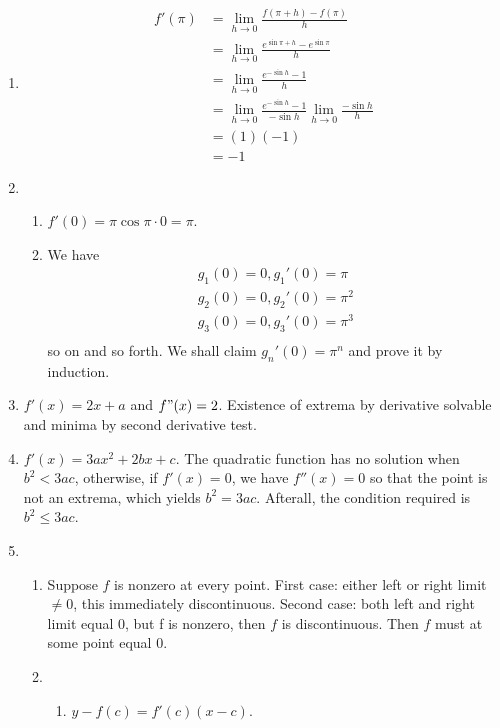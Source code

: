 \documentclass[12pt]{article}
\begin{document}
    \begin{enumerate}
        \item \begin{align*}
            f'(\pi)&=\lim_{h\to 0}\frac{f(\pi+h)-f(\pi)}{h}\\
            &=\lim_{h\to 0}\frac{e^{\sin{\pi+h}}-e^{\sin{\pi}}}{h}\\
            &=\lim_{h\to 0}\frac{e^{-\sin{h}}-1}{h}\\
            &=\lim_{h\to 0}\frac{e^{-\sin{h}}-1}{-\sin{h}}\lim_{h\to 0}\frac{-\sin{h}}{h}\\
            &=(1)(-1)\\
            &=-1
        \end{align*}
        \item \begin{enumerate}
            \item $f'(0)=\pi\cos{\pi\cdot 0}=\pi$.
            \item We have \begin{align*}
                g_1(0)=0, g_1'(0)=\pi\\
                g_2(0)=0, g_2'(0)=\pi^2\\
                g_3(0)=0, g_3'(0)=\pi^3\\
            \end{align*}
            so on and so forth. We shall claim $g_n'(0)=\pi^n$ and prove it by induction.
        \end{enumerate}
        \item $f'(x)=2x+a$ and $f"(x)=2$. Existence of extrema by derivative solvable and minima by second derivative test.
        \item $f'(x)=3ax^2+2bx+c$. The quadratic function has no solution when $b^2<3ac$, otherwise, if $f'(x)=0$, we have $f''(x)=0$ so that the point is not an extrema, which yields $b^2=3ac$. Afterall, the condition required is $b^2\leq 3ac$.
        \item \begin{enumerate}
            \item Suppose $f$ is nonzero at every point. First case: either left or right limit $\neq 0$, this immediately discontinuous. Second case: both left and right limit equal 0, but f is nonzero, then $f$ is discontinuous. Then $f$ must at some point equal 0.
            \item \begin{enumerate}
                \item $y-f(c)=f'(c)(x-c)$.

\end{enumerate}
\end{enumerate}
\end{enumerate}
\end{document}
